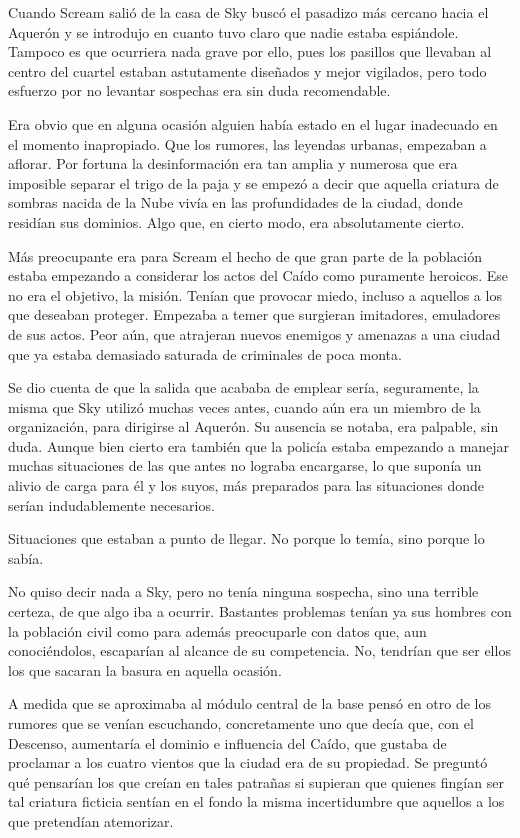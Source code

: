 \bigskip\noindent
Cuando Scream salió de la casa de Sky buscó el pasadizo más cercano hacia el Aquerón y se introdujo en cuanto tuvo claro que nadie estaba espiándole. Tampoco es que ocurriera nada grave por ello, pues los pasillos que llevaban al centro del cuartel estaban astutamente diseñados y mejor vigilados, pero todo esfuerzo por no levantar sospechas era sin duda recomendable.

Era obvio que en alguna ocasión alguien había estado en el lugar inadecuado en el momento inapropiado. Que los rumores, las leyendas urbanas, empezaban a aflorar. Por fortuna la desinformación era tan amplia y numerosa que era imposible separar el trigo de la paja y se empezó a decir que aquella criatura de sombras nacida de la Nube vivía en las profundidades de la ciudad, donde residían sus dominios. Algo que, en cierto modo, era absolutamente cierto.

Más preocupante era para Scream el hecho de que gran parte de la población estaba empezando a considerar los actos del Caído como puramente heroicos. Ese no era el objetivo, la misión. Tenían que provocar miedo, incluso a aquellos a los que deseaban proteger. Empezaba a temer que surgieran imitadores, emuladores de sus actos. Peor aún, que atrajeran nuevos enemigos y amenazas a una ciudad que ya estaba demasiado saturada de criminales de poca monta.

Se dio cuenta de que la salida que acababa de emplear sería, seguramente, la misma que Sky utilizó muchas veces antes, cuando aún era un miembro de la organización, para dirigirse al Aquerón. Su ausencia se notaba, era palpable, sin duda. Aunque bien cierto era también que la policía estaba empezando a manejar muchas situaciones de las que antes no lograba encargarse, lo que suponía un alivio de carga para él y los suyos, más preparados para las situaciones donde serían indudablemente necesarios.

Situaciones que estaban a punto de llegar. No porque lo temía, sino porque lo sabía.

No quiso decir nada a Sky, pero no tenía ninguna sospecha, sino una terrible certeza, de que algo iba a ocurrir. Bastantes problemas tenían ya sus hombres con la población civil como para además preocuparle con datos que, aun conociéndolos, escaparían al alcance de su competencia. No, tendrían que ser ellos los que sacaran la basura en aquella ocasión.

A medida que se aproximaba al módulo central de la base pensó en otro de los rumores que se venían escuchando, concretamente uno que decía que, con el Descenso, aumentaría el dominio e influencia del Caído, que gustaba de proclamar a los cuatro vientos que la ciudad era de su propiedad. Se preguntó qué pensarían los que creían en tales patrañas si supieran que quienes fingían ser tal criatura ficticia sentían en el fondo la misma incertidumbre que aquellos a los que pretendían atemorizar.

